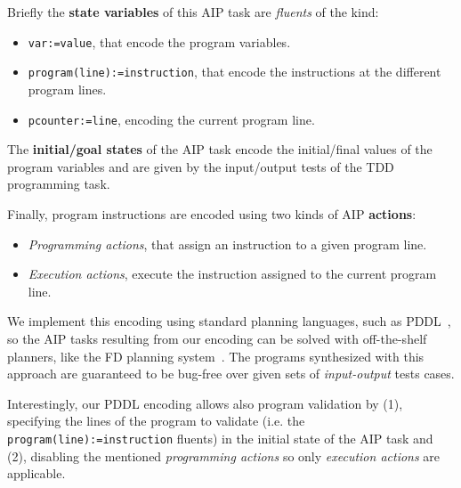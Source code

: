 \documentclass[10pt,a4paper]{paper}
\begin{document}
Briefly the {\bf state variables} of this AIP task are {\em fluents} of the kind:
\begin{itemize}
\item {\tt var:=value}, that encode the program variables.
\item {\tt program(line):=instruction}, that encode the instructions at the different program lines.
\item {\tt pcounter:=line}, encoding the current program line.
\end {itemize}

The {\bf initial/goal states} of the AIP task encode the initial/final values of the program variables and are given by the input/output tests of the TDD programming task.

Finally, program instructions are encoded using two kinds of AIP {\bf actions}:
\begin{itemize}
\item {\it Programming actions}, that assign an instruction to a given program line.
\item {\it Execution actions}, execute the instruction assigned to the current program line.
\end{itemize}
We implement this encoding using standard planning languages, such as PDDL~\cite{fox2003pddl2}, so the AIP tasks resulting from our encoding can be solved with off-the-shelf planners, like the {\sc FD} planning system~\cite{helmert2006fast}. The programs synthesized with this approach are guaranteed to be bug-free over given sets of {\em input-output} tests cases.

Interestingly, our PDDL encoding allows also program validation by (1), specifying the lines of the program to validate (i.e. the {\tt program(line):=instruction} fluents) in the initial state of the AIP task and (2), disabling the mentioned {\it programming actions} so only {\it execution actions} are applicable. 
\end{document}
